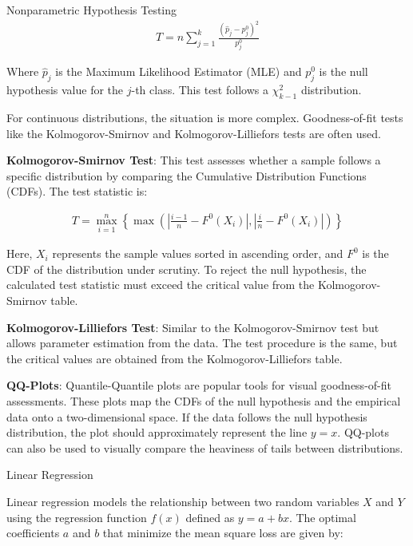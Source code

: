 \documentclass{beamer}
\begin{document}
\begin{columns}
\begin{column}{0.3\textwidth}
\begin{block}{Nonparametric Hypothesis Testing}
\begin{align*}
    T = n \sum_{j=1}^{k} \frac{(\hat{p}_j - p^0_j)^2}{p^0_j}
\end{align*}

Where $\hat{p}_j$ is the Maximum Likelihood Estimator (MLE) and $p^0_j$ is the null hypothesis value for the $j$-th class. This test follows a $\chi^2_{k-1}$ distribution.

For continuous distributions, the situation is more complex. Goodness-of-fit tests like the Kolmogorov-Smirnov and Kolmogorov-Lilliefors tests are often used.

\textbf{Kolmogorov-Smirnov Test}: This test assesses whether a sample follows a specific distribution by comparing the Cumulative Distribution Functions (CDFs). The test statistic is:

\begin{align*}
    T = \max_{i=1}^{n} \left\{ \max \left( \left| \frac{i-1}{n} - F^0(X_i) \right|, \left| \frac{i}{n} - F^0(X_i) \right| \right) \right\}
\end{align*}

Here, $X_i$ represents the sample values sorted in ascending order, and $F^0$ is the CDF of the distribution under scrutiny. To reject the null hypothesis, the calculated test statistic must exceed the critical value from the Kolmogorov-Smirnov table. 

\textbf{Kolmogorov-Lilliefors Test}: Similar to the Kolmogorov-Smirnov test but allows parameter estimation from the data. The test procedure is the same, but the critical values are obtained from the Kolmogorov-Lilliefors table.

\textbf{QQ-Plots}: Quantile-Quantile plots are popular tools for visual goodness-of-fit assessments. These plots map the CDFs of the null hypothesis and the empirical data onto a two-dimensional space. If the data follows the null hypothesis distribution, the plot should approximately represent the line $y=x$. QQ-plots can also be used to visually compare the heaviness of tails between distributions.

\end{block}

\begin{block}{Linear Regression}

Linear regression models the relationship between two random variables \(X\) and \(Y\) using the regression function \(f(x)\) defined as \(y = a + bx\). The optimal coefficients \(a\) and \(b\) that minimize the mean square loss are given by:


\end{block}
\end{column}
\end{columns}
\end{document}
